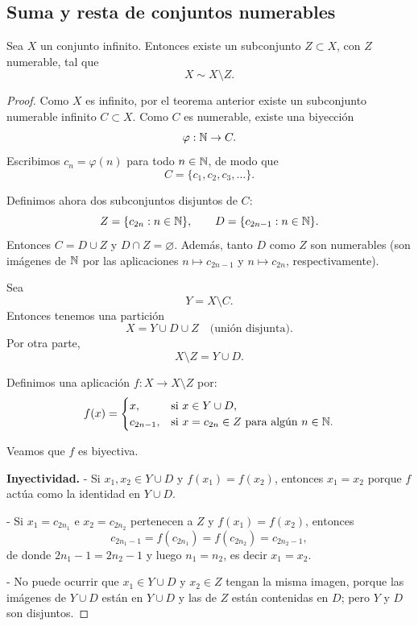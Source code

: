 \subsection{Suma y resta de conjuntos numerables}

\begin{prop}
Sea $X$ un conjunto infinito. Entonces existe un subconjunto
$Z \subset X$, con $Z$ numerable, tal que
\[
X \sim X \setminus Z.
\]
\end{prop}

\begin{proof}
Como $X$ es infinito, por el teorema anterior existe un subconjunto
numerable infinito $C \subset X$. Como $C$ es numerable, existe una
biyección
\[
\varphi : \mathbb{N} \to C.
\]
Escribimos $c_n = \varphi(n)$ para todo $n \in \mathbb{N}$, de modo que
\[
C = \{c_1, c_2, c_3,\dots\}.
\]

Definimos ahora dos subconjuntos disjuntos de $C$:
\[
Z = \{c_{2n} : n \in \mathbb{N}\}, \qquad
D = \{c_{2n-1} : n \in \mathbb{N}\}.
\]
Entonces $C = D \cup Z$ y $D \cap Z = \varnothing$. Además, tanto $D$
como $Z$ son numerables (son imágenes de $\mathbb{N}$ por las aplicaciones
$n \mapsto c_{2n-1}$ y $n \mapsto c_{2n}$, respectivamente).

Sea
\[
Y = X \setminus C.
\]
Entonces tenemos una partición
\[
X = Y \cup D \cup Z
\quad\text{(unión disjunta)}.
\]
Por otra parte,
\[
X \setminus Z = Y \cup D.
\]

Definimos una aplicación $f : X \to X \setminus Z$ por:
\[
f(x) =
\begin{cases}
x, & \text{si } x \in Y \cup D,\\
c_{2n-1}, & \text{si } x = c_{2n} \in Z \text{ para algún } n \in \mathbb{N}.
\end{cases}
\]

Veamos que $f$ es biyectiva.

\medskip

\noindent\textbf{Inyectividad.}
- Si $x_1,x_2 \in Y \cup D$ y $f(x_1) = f(x_2)$, entonces $x_1 = x_2$
  porque $f$ actúa como la identidad en $Y \cup D$.

- Si $x_1 = c_{2n_1}$ e $x_2 = c_{2n_2}$ pertenecen a $Z$ y
  $f(x_1) = f(x_2)$, entonces
  \[
  c_{2n_1-1} = f(c_{2n_1}) = f(c_{2n_2}) = c_{2n_2-1},
  \]
  de donde $2n_1-1 = 2n_2-1$ y luego $n_1 = n_2$, es decir
  $x_1 = x_2$.

- No puede ocurrir que $x_1 \in Y \cup D$ y $x_2 \in Z$ tengan la
  misma imagen, porque las imágenes de $Y \cup D$ están en $Y \cup D$
  y las de $Z$ están contenidas en $D$; pero $Y$ y $D$ son disjuntos.


\end{proof}
